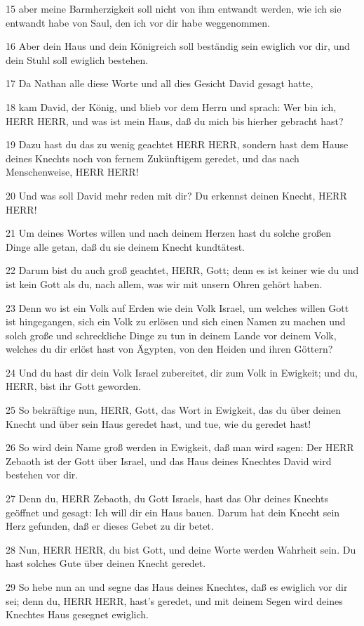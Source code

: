 \par 15 aber meine Barmherzigkeit soll nicht von ihm entwandt werden, wie ich sie entwandt habe von Saul, den ich vor dir habe weggenommen.
\par 16 Aber dein Haus und dein Königreich soll beständig sein ewiglich vor dir, und dein Stuhl soll ewiglich bestehen.
\par 17 Da Nathan alle diese Worte und all dies Gesicht David gesagt hatte,
\par 18 kam David, der König, und blieb vor dem Herrn und sprach: Wer bin ich, HERR HERR, und was ist mein Haus, daß du mich bis hierher gebracht hast?
\par 19 Dazu hast du das zu wenig geachtet HERR HERR, sondern hast dem Hause deines Knechts noch von fernem Zukünftigem geredet, und das nach Menschenweise, HERR HERR!
\par 20 Und was soll David mehr reden mit dir? Du erkennst deinen Knecht, HERR HERR!
\par 21 Um deines Wortes willen und nach deinem Herzen hast du solche großen Dinge alle getan, daß du sie deinem Knecht kundtätest.
\par 22 Darum bist du auch groß geachtet, HERR, Gott; denn es ist keiner wie du und ist kein Gott als du, nach allem, was wir mit unsern Ohren gehört haben.
\par 23 Denn wo ist ein Volk auf Erden wie dein Volk Israel, um welches willen Gott ist hingegangen, sich ein Volk zu erlösen und sich einen Namen zu machen und solch große und schreckliche Dinge zu tun in deinem Lande vor deinem Volk, welches du dir erlöst hast von Ägypten, von den Heiden und ihren Göttern?
\par 24 Und du hast dir dein Volk Israel zubereitet, dir zum Volk in Ewigkeit; und du, HERR, bist ihr Gott geworden.
\par 25 So bekräftige nun, HERR, Gott, das Wort in Ewigkeit, das du über deinen Knecht und über sein Haus geredet hast, und tue, wie du geredet hast!
\par 26 So wird dein Name groß werden in Ewigkeit, daß man wird sagen: Der HERR Zebaoth ist der Gott über Israel, und das Haus deines Knechtes David wird bestehen vor dir.
\par 27 Denn du, HERR Zebaoth, du Gott Israels, hast das Ohr deines Knechts geöffnet und gesagt: Ich will dir ein Haus bauen. Darum hat dein Knecht sein Herz gefunden, daß er dieses Gebet zu dir betet.
\par 28 Nun, HERR HERR, du bist Gott, und deine Worte werden Wahrheit sein. Du hast solches Gute über deinen Knecht geredet.
\par 29 So hebe nun an und segne das Haus deines Knechtes, daß es ewiglich vor dir sei; denn du, HERR HERR, hast's geredet, und mit deinem Segen wird deines Knechtes Haus gesegnet ewiglich.


